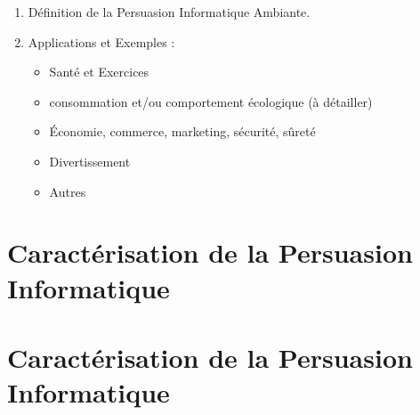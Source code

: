 \documentclass[10pt,a5paper,twoside]{article}
\begin{document}
\begin{enumerate}
\def\labelenumi{\arabic{enumi}.}
\itemsep1pt\parskip0pt
\item
  Définition de la Persuasion Informatique Ambiante.
\item
  Applications et Exemples :

  \begin{itemize}
  \itemsep1pt\parskip0pt
  \item
    Santé et Exercices
  \item
    consommation et/ou comportement écologique (à détailler)
  \item
    Économie, commerce, marketing, sécurité, sûreté
  \item
    Divertissement
  \item
    Autres
  \end{itemize}
\end{enumerate}

\section{Caractérisation de la Persuasion
Informatique}\label{caractuxe9risation-de-la-persuasion-informatique}

\section{Caractérisation de la Persuasion
Informatique}\label{caractuxe9risation-de-la-persuasion-informatique-1}

\renewcommand\refname{Caractérisation de la Persuasion Informatique}

\end{document}
